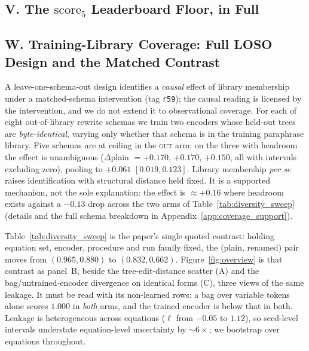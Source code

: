 \FloatBarrier
\subsection*{V. The $\mathrm{score}_5$ Leaderboard Floor, in Full}



\FloatBarrier
\subsection*{W. Training-Library Coverage: Full LOSO Design and the Matched Contrast}

A leave-one-schema-out design identifies a \emph{causal} effect of library membership under a matched-schema intervention (tag \texttt{r59}); the causal reading is licensed by the intervention, and we do not extend it to observational coverage. For each of eight out-of-library rewrite schemas we train two encoders whose held-out trees are \emph{byte-identical}, varying only whether that schema is in the training paraphrase library. Five schemas are at ceiling in the \textsc{out} arm; on the three with headroom the effect is unambiguous ($\Delta$plain $= +0.170$, $+0.170$, $+0.150$, all with intervals excluding zero), pooling to $+0.061$ $[0.019, 0.123]$. Library membership \emph{per se} raises identification with structural distance held fixed. It is a supported mechanism, not the sole explanation: the effect is ${\approx}{+}0.16$ where headroom exists against a ${-}0.13$ drop across the two arms of Table~\ref{tab:diversity_sweep} (details and the full schema breakdown in Appendix~\ref{app:coverage_support}).

Table~\ref{tab:diversity_sweep} is the paper's single quoted contrast: holding equation set, encoder, procedure and run family fixed, the (plain, renamed) pair moves from $(0.965, 0.880)$ to $(0.832, 0.662)$. Figure~\ref{fig:overview} is that contrast as panel~B, beside the tree-edit-distance scatter (A) and the bag/untrained-encoder divergence on identical forms (C), three views of the same leakage. It must be read with its non-learned rows: a bag over variable tokens alone scores $1.000$ in \emph{both} arms, and the trained encoder is below that in both. Leakage is heterogeneous across equations ($\ell$ from $-0.05$ to $1.12$), so seed-level intervals understate equation-level uncertainty by ${\sim}6{\times}$; we bootstrap over equations throughout.

